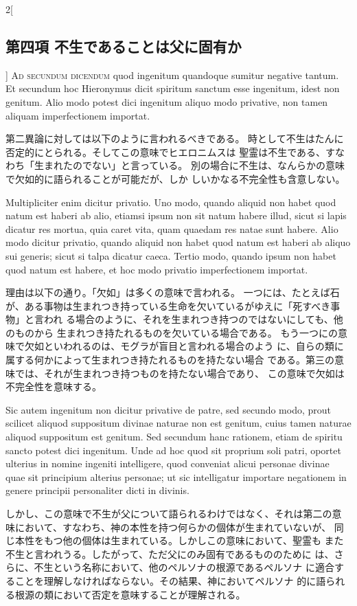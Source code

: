 \documentclass[paper=a4paper,fontsize=10pt,jafontsize=9pt,titlepage]{jlreq}
\begin{document}
\begin{paracol}{2}[\subsection{第四項 不生であることは父に固有か}]
{\scshape Ad secundum dicendum} quod ingenitum quandoque sumitur negative
tantum. Et secundum hoc Hieronymus dicit spiritum sanctum esse
ingenitum, idest non genitum. Alio modo potest dici ingenitum aliquo
modo privative, non tamen aliquam imperfectionem
importat.


\switchcolumn


第二異論に対しては以下のように言われるべきである。
時として不生はたんに否定的にとられる。そしてこの意味でヒエロニムスは
聖霊は不生である、すなわち「生まれたのでない」と言っている。
別の場合に不生は、なんらかの意味で欠如的に語られることが可能だが、しか
 しいかなる不完全性も含意しない。


\switchcolumn*


Multipliciter enim dicitur privatio. Uno modo, quando
aliquid non habet quod natum est haberi ab alio, etiamsi ipsum non sit
natum habere illud, sicut si lapis dicatur res mortua, quia caret
vita, quam quaedam res natae sunt habere. Alio modo dicitur privatio,
quando aliquid non habet quod natum est haberi ab aliquo sui generis;
sicut si talpa dicatur caeca. Tertio modo, quando ipsum non habet quod
natum est habere, et hoc modo privatio imperfectionem importat.


\switchcolumn


理由は以下の通り。「欠如」は多くの意味で言われる。
一つには、たとえば石が、ある事物は生まれつき持っている生命を欠いているがゆえに「死すべき事物」と言われ
 る場合のように、それを生まれつき持つのではないにしても、他のものから
 生まれつき持たれるものを欠いている場合である。
もう一つにの意味で欠如といわれるのは、モグラが盲目と言われる場合のよう
 に、自らの類に属する何かによって生まれつき持たれるものを持たない場合
 である。第三の意味では、それが生まれつき持つものを持たない場合であり、
 この意味で欠如は不完全性を意味する。


\switchcolumn*


Sic
autem ingenitum non dicitur privative de patre, sed secundo modo,
prout scilicet aliquod suppositum divinae naturae non est genitum,
cuius tamen naturae aliquod suppositum est genitum. Sed secundum hanc
rationem, etiam de spiritu sancto potest dici ingenitum. Unde ad hoc
quod sit proprium soli patri, oportet ulterius in nomine ingeniti
intelligere, quod conveniat alicui personae divinae quae sit
principium alterius personae; ut sic intelligatur importare negationem
in genere principii personaliter dicti in divinis.


\switchcolumn


しかし、この意味で不生が父について語られるわけではなく、それは第二の意
 味において、すなわち、神の本性を持つ何らかの個体が生まれていないが、
 同じ本性をもつ他の個体は生まれている。しかしこの意味において、聖霊も
 また不生と言われうる。したがって、ただ父にのみ固有であるもののために
 は、さらに、不生という名称において、他のペルソナの根源であるペルソナ
 に適合することを理解しなければならない。その結果、神においてペルソナ
 的に語られる根源の類において否定を意味することが理解される。



\end{paracol}
\end{document}
